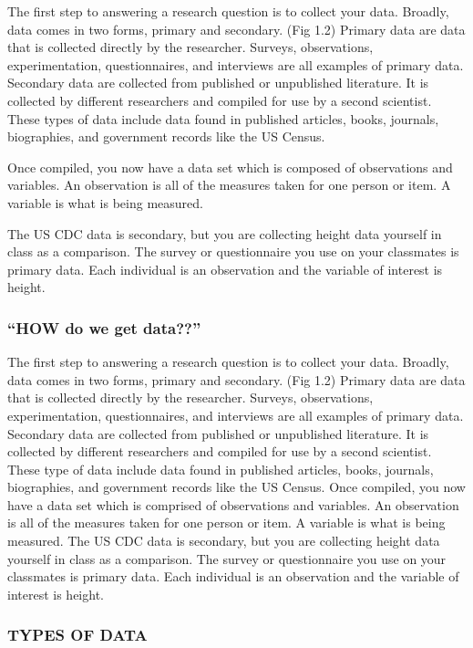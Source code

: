 \documentclass[
]{book}
\begin{document}
The first step to answering a research question is to collect your data. Broadly, data comes in two forms, primary and secondary. (Fig 1.2) Primary data are data that is collected directly by the researcher. Surveys, observations, experimentation, questionnaires, and interviews are all examples of primary data. Secondary data are collected from published or unpublished literature. It is collected by different researchers and compiled for use by a second scientist. These types of data include data found in published articles, books, journals, biographies, and government records like the US Census.

Once compiled, you now have a data set which is composed of observations and variables. An observation is all of the measures taken for one person or item. A variable is what is being measured.

The US CDC data is secondary, but you are collecting height data yourself in class as a comparison. The survey or questionnaire you use on your classmates is primary data. Each individual is an observation and the variable of interest is height.

\hypertarget{how-do-we-get-data}{%
\subsubsection{``HOW do we get data??''}\label{how-do-we-get-data}}

The first step to answering a research question is to collect your data. Broadly, data comes in two forms, primary and secondary. (Fig 1.2) Primary data are data that is collected directly by the researcher. Surveys, observations, experimentation, questionnaires, and interviews are all examples of primary data. Secondary data are collected from published or unpublished literature. It is collected by different researchers and compiled for use by a second scientist. These type of data include data found in published articles, books, journals, biographies, and government records like the US Census.
Once compiled, you now have a data set which is comprised of observations and variables. An observation is all of the measures taken for one person or item. A variable is what is being measured.
The US CDC data is secondary, but you are collecting height data yourself in class as a comparison. The survey or questionnaire you use on your classmates is primary data. Each individual is an observation and the variable of interest is height.

\hypertarget{types-of-data}{%
\subsubsection{TYPES OF DATA}\label{types-of-data}}
\end{document}
